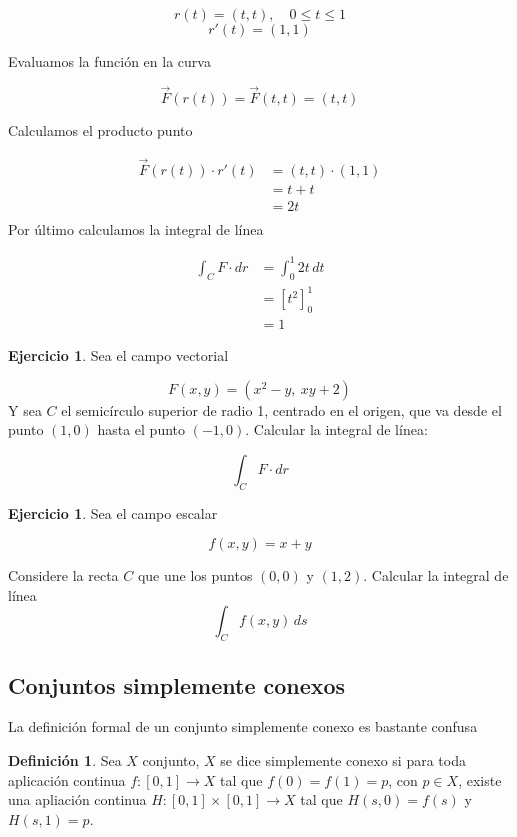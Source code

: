 \documentclass{article}
\theoremstyle{plain}
\theoremstyle{definition}
\newtheorem{defin}[thm]{Definición}
\newtheorem{ejer}[thm]{Ejercicio}
\begin{document}
\[
r(t) = (t, t), \quad 0 \leq t \leq 1
\]
\[
r'(t) = (1, 1)
\]

Evaluamos la funci\'on en la curva

\[
\vec{F}(r(t)) = \vec{F}(t, t) = (t, t)
\]

Calculamos el producto punto

\begin{align*}
    \vec{F}(r(t)) \cdot r'(t) &= (t, t) \cdot (1, 1) \\
                         &= t + t \\
                         &= 2t \\
\end{align*}
Por \'ultimo calculamos la integral de l\'inea

\begin{align*}
    \int_C F \cdot dr &= \int_0^1 2t \, dt \\
&= \left[t^2\right]_0^1 \\
&= 1
\end{align*}



\begin{ejer}Sea el campo vectorial
\end{ejer}
\[
F(x, y) = (x^2 - y,\ xy + 2)
\]
Y sea \( C \) el semicírculo superior de radio 1, centrado en el origen, que va desde el punto \( (1, 0) \) hasta el punto \( (-1, 0) \). Calcular la integral de línea:

\[
\int_C F \cdot dr
\]

\begin{ejer}Sea el campo escalar
\end{ejer}
\[
f(x, y) = x + y
\]

Considere la recta \( C \)  que une los puntos \( (0, 0) \) y \( (1, 2) \). Calcular la integral de línea
\[
\int_C f(x, y) \, ds
\]

\newpage

\subsection{Conjuntos simplemente conexos}

La definici\'on formal de un conjunto simplemente conexo es bastante confusa \\

\begin{defin}Sea $X$ conjunto, $X$ se dice simplemente conexo si para toda aplicaci\'on continua $f:[0,1] \to X$ tal que $f(0)=f(1)=p$, con $p \in X$, existe una apliaci\'on continua $H: [0,1] \times [0,1] \to X$ tal que $H(s,0) =f(s)$ y $H(s,1)=p$. \\
\end{defin}
\end{document}
